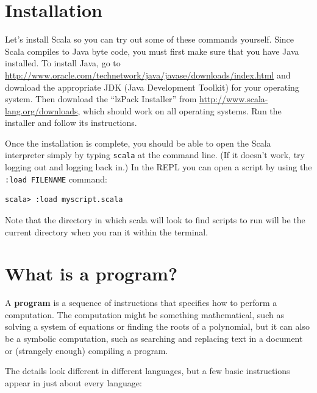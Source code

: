 \documentclass[10pt]{book}
\begin{document}

\section{Installation}

Let's install Scala so you can try out some of these commands yourself. Since Scala compiles to Java
byte code, you must first make sure that you have Java installed. To install Java, go to \url{http://www.oracle.com/technetwork/java/javase/downloads/index.html}
and download the appropriate JDK (Java Development Toolkit) for your operating system. Then download the
``lzPack Installer'' from \url{http://www.scala-lang.org/downloads}, which should
work on all operating systems. Run the installer and follow its instructions.  

Once the installation is complete, you should be able to open the Scala interpreter simply by typing
\verb#scala# at the command line. (If it doesn't work, try logging out and logging back in.) In the REPL
 you can open a script by using the
 \verb#:load FILENAME# command:

\beforeverb
\begin{verbatim}
scala> :load myscript.scala
\end{verbatim}
\afterverb

Note that the directory in which scala will look to find scripts to run will be the current directory when you ran it within the terminal.

\section{What is a program?}

A {\bf program} is a sequence of instructions that specifies how to perform a computation.  The computation might be something mathematical, such as solving a system of equations or finding the roots of a polynomial, but it can also be a symbolic computation, such as searching and replacing text in a document or (strangely enough) compiling a program.


The details look different in different languages, but a few basic instructions appear in just about every language:
\end{document}

